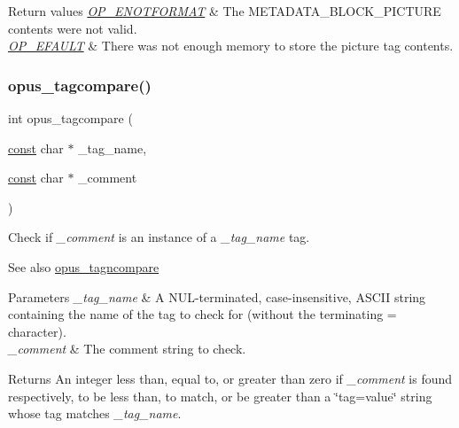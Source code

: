 \begin{DoxyRetVals}{Return values}
{\em \hyperlink{group__error__codes_gafca3ae244d24e10b2851c77379453220}{O\+P\+\_\+\+E\+N\+O\+T\+F\+O\+R\+M\+AT}} & The M\+E\+T\+A\+D\+A\+T\+A\+\_\+\+B\+L\+O\+C\+K\+\_\+\+P\+I\+C\+T\+U\+RE contents were not valid. \\
\hline
{\em \hyperlink{group__error__codes_ga2ddb887c0bb55c74ea6be391fabcba59}{O\+P\+\_\+\+E\+F\+A\+U\+LT}} & There was not enough memory to store the picture tag contents. \\
\hline
\end{DoxyRetVals}
\mbox{\label{group__header__info_gaad7582aee9be320d26b13f77e7b54106}} 
\subsubsection{\texorpdfstring{opus\+\_\+tagcompare()}{opus\_tagcompare()}}
{\footnotesize\ttfamily int opus\+\_\+tagcompare (\begin{DoxyParamCaption}\item[{\hyperlink{zconf_8h_a2c212835823e3c54a8ab6d95c652660e}{const} char $\ast$}]{\+\_\+tag\+\_\+name,  }\item[{\hyperlink{zconf_8h_a2c212835823e3c54a8ab6d95c652660e}{const} char $\ast$}]{\+\_\+comment }\end{DoxyParamCaption})}

Check if {\itshape \+\_\+comment} is an instance of a {\itshape \+\_\+tag\+\_\+name} tag. \begin{DoxySeeAlso}{See also}
\hyperlink{group__header__info_gabf02fa65e49fde045ef787e42ef7b8c0}{opus\+\_\+tagncompare} 
\end{DoxySeeAlso}

\begin{DoxyParams}{Parameters}
{\em \+\_\+tag\+\_\+name} & A N\+U\+L-\/terminated, case-\/insensitive, A\+S\+C\+II string containing the name of the tag to check for (without the terminating \textquotesingle{}=\textquotesingle{} character). \\
\hline
{\em \+\_\+comment} & The comment string to check. \\
\hline
\end{DoxyParams}
\begin{DoxyReturn}{Returns}
An integer less than, equal to, or greater than zero if {\itshape \+\_\+comment} is found respectively, to be less than, to match, or be greater than a \char`\"{}tag=value\char`\"{} string whose tag matches {\itshape \+\_\+tag\+\_\+name}. 
\end{DoxyReturn}
\mbox{\label{group__header__info_gabf02fa65e49fde045ef787e42ef7b8c0}} 
